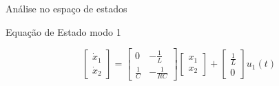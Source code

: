 \documentclass[aspectratio=169]{beamer}
\begin{document}
\begin{frame}{Análise no espaço de estados}

\begin{block}{Equação de Estado modo 1}
\begin{center}
    
      $$\begin{bmatrix} 
        \dot{x}_1 \\ 
        \dot{x}_2 
      \end{bmatrix} = 
      \begin{bmatrix} 
        0 & -\frac{1}{L} \\ 
        \frac{1}{C} & -\frac{1}{RC} 
      \end{bmatrix}
      \begin{bmatrix} 
        x_1 \\ 
        x_2 
      \end{bmatrix} + 
      \begin{bmatrix} 
        \frac{1}{L} \\ 
        0 
      \end{bmatrix} u_1(t)$$
    \end{center}
  \end{block}
\end{frame}
\end{document}
